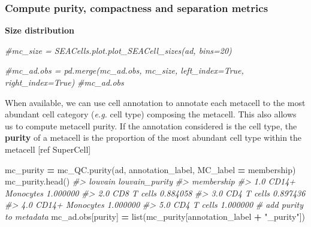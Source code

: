 \documentclass[
]{book}
\newenvironment{Shaded}{\begin{snugshade}}{\end{snugshade}}
\newcommand{\BuiltInTok}[1]{#1}
\newcommand{\CommentTok}[1]{\textcolor[rgb]{0.56,0.35,0.01}{\textit{#1}}}
\newcommand{\NormalTok}[1]{#1}
\newcommand{\OperatorTok}[1]{\textcolor[rgb]{0.81,0.36,0.00}{\textbf{#1}}}
\newcommand{\StringTok}[1]{\textcolor[rgb]{0.31,0.60,0.02}{#1}}
\begin{document}
\hypertarget{compute-purity-compactness-and-separation-metrics}{%
\subsubsection*{Compute purity, compactness and separation metrics}\label{compute-purity-compactness-and-separation-metrics}}

\textbf{Size distribution}

\begin{Shaded}
\begin{Highlighting}[]
\CommentTok{\#mc\_size = SEACells.plot.plot\_SEACell\_sizes(ad, bins=20)}

\CommentTok{\#mc\_ad.obs = pd.merge(mc\_ad.obs, mc\_size, left\_index=True, right\_index=True)}
\CommentTok{\#mc\_ad.obs}
\end{Highlighting}
\end{Shaded}

When available, we can use cell annotation to annotate each metacell to the most abundant cell category (\emph{e.g.} cell type) composing the metacell.
This also allows us to compute metacell purity. If the annotation considered is the cell type, the \textbf{purity} of a metacell is the proportion of the most abundant cell type within the metacell {[}ref SuperCell{]}

\begin{Shaded}
\begin{Highlighting}[]
\NormalTok{mc\_purity }\OperatorTok{=}\NormalTok{ mc\_QC.purity(ad, annotation\_label, MC\_label }\OperatorTok{=} \StringTok{\textquotesingle{}membership\textquotesingle{}}\NormalTok{)}
\NormalTok{mc\_purity.head()}
\CommentTok{\#\textgreater{}                     louvain  louvain\_purity}
\CommentTok{\#\textgreater{} membership                                 }
\CommentTok{\#\textgreater{} 1.0         CD14+ Monocytes        1.000000}
\CommentTok{\#\textgreater{} 2.0             CD8 T cells        0.884058}
\CommentTok{\#\textgreater{} 3.0             CD4 T cells        0.897436}
\CommentTok{\#\textgreater{} 4.0         CD14+ Monocytes        1.000000}
\CommentTok{\#\textgreater{} 5.0             CD4 T cells        1.000000}
\CommentTok{\# add purity to metadata}
\NormalTok{mc\_ad.obs[}\StringTok{\textquotesingle{}purity\textquotesingle{}}\NormalTok{] }\OperatorTok{=} \BuiltInTok{list}\NormalTok{(mc\_purity[annotation\_label }\OperatorTok{+} \StringTok{"\_purity"}\NormalTok{])}
\end{Highlighting}
\end{Shaded}
\end{document}
